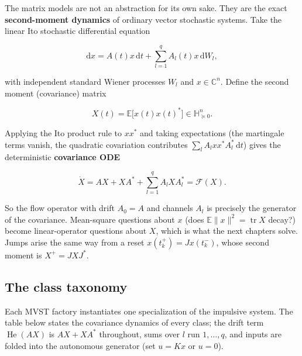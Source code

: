 \documentclass[11pt,oneside]{report}
\begin{document}
The matrix models are not an abstraction for its own sake. They are the exact
\textbf{second-moment dynamics} of ordinary vector stochastic systems. Take the
linear Ito stochastic differential equation

\[\mathrm{d}x=A(t) x\,\mathrm{d}t+\sum_{l=1}^{q}A_l(t) x\,\mathrm{d}W_l,\]

with independent standard Wiener processes \(W_l\) and \(x\in\mathbb{C}^n\). Define
the second moment (covariance) matrix

\[X(t)=\mathbb{E}\big[x(t) x(t)^{*}\big]\in\mathbb{H}^{n}_{\succeq 0}.\]

Applying the Ito product rule to \(x x^{*}\) and taking expectations (the
martingale terms vanish, the quadratic covariation contributes
\(\sum_l A_l x x^{*} A_l^{*}\,\mathrm{d}t\)) gives the deterministic \textbf{covariance
ODE}

\[\dot X=A X+X A^{*}+\sum_{l=1}^{q}A_l X A_l^{*}=\mathcal{F}(X).\]

So the flow operator with drift \(A_0=A\) and channels \(A_l\) is precisely the
generator of the covariance. Mean-square questions about \(x\) (does
\(\mathbb{E}\|x\|^{2}=\operatorname{tr}X\) decay?) become linear-operator
questions about \(X\), which is what the next chapters solve. Jumps arise the same
way from a reset \(x(t_k^{+})=J x(t_k^{-})\), whose second moment is
\(X^{+}=J X J^{*}\).

\hypertarget{the-class-taxonomy}{%
\subsection{The class taxonomy}\label{the-class-taxonomy}}

Each MVST factory instantiates one specialization of the impulsive system. The
table below states the covariance dynamics of every class; the drift term
\(\operatorname{He}(AX)\) is \(AX+XA^{*}\) throughout, sums over \(l\) run
\(1,\dots,q\), and inputs are folded into the autonomous generator (set \(u=Kx\) or
\(u=0\)).
\end{document}
